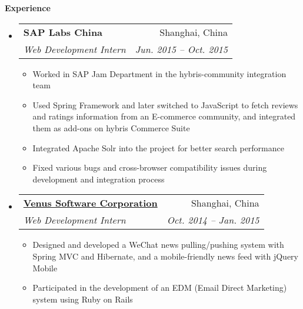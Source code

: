 \documentclass[letterpaper,11pt]{article}
\makeatletter
\newcommand{\resitem}[1]{\item #1 \vspace{-2pt}}
\newcommand{\resheading}[1]{{\large \colorbox{mygrey}{\begin{minipage}{\textwidth}{\textbf{#1 \vphantom{p\^{E}}}}\end{minipage}}}}
\newcommand{\ressubheading}[4]{
\begin{tabular*}{6.5in}{l@{\extracolsep{\fill}}r}
    \textbf{#1} & #2 \\
    \textit{#3} & \textit{#4} \\
\end{tabular*}\vspace{-6pt}}
\makeatother
\begin{document}
    \resheading{Experience}
    \begin{itemize}
        \item  %
        \ressubheading{SAP Labs China}{Shanghai, China}
        {Web Development Intern}{Jun. 2015 -- Oct. 2015}
        { \footnotesize
        \begin{itemize}
            \resitem{Worked in SAP Jam Department in the hybris-community integration team}
            \resitem{Used Spring Framework and later switched to JavaScript to fetch reviews and ratings information from an E-commerce community, and integrated them as add-ons on hybris Commerce Suite}
            \resitem{Integrated Apache Solr into the project for better search performance}
            \resitem{Fixed various bugs and cross-browser compatibility issues during development and integration process}
        \end{itemize}
        }

        \item %
        \ressubheading{\href{http://www.vsc.com}{Venus Software Corporation}}{Shanghai, China}{Web Development Intern}{Oct. 2014 -- Jan. 2015}
        { \footnotesize
        \begin{itemize}
            \resitem{Designed and developed a WeChat news pulling/pushing system with Spring MVC
            and Hibernate, and a mobile-friendly news feed with jQuery Mobile}
            \resitem{Participated in the development of an EDM (Email Direct Marketing) system using
            Ruby on Rails}
        \end{itemize}
        }

    \end{itemize}  %





\end{document}
